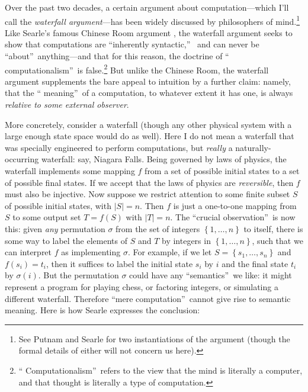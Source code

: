 \documentclass[12pt,onecolumn]{article}%
\begin{document}
Over the past two decades, a certain argument about computation---which I'll
call the \textit{waterfall argument}---has been widely discussed by
philosophers of mind.\footnote{See Putnam \cite[appendix]{putnam} and Searle
\cite{searle:redis} for two instantiations of the argument (though the formal
details of either will not concern us here).} Like Searle's famous Chinese
Room argument \cite{searle}, the waterfall argument seeks to show that
computations are \textquotedblleft inherently syntactic,\textquotedblright\ %
 and can never be \textquotedblleft about\textquotedblright\  anything---and
that for this reason, the doctrine of \textquotedblleft
computationalism\textquotedblright\  is false.\footnote{\textquotedblleft
Computationalism\textquotedblright\  refers to the view that the mind is
literally a computer, and that thought is literally a type of computation.}
 But unlike the Chinese Room, the waterfall argument supplements the bare
appeal to intuition by a further claim: namely, that the \textquotedblleft
meaning\textquotedblright\  of a computation, to whatever extent it has one, is
always \textit{relative to some external observer}.

More concretely, consider a waterfall (though any other physical system with a
large enough state space would do as well). Here I do not mean a waterfall
that was specially engineered to perform computations, but \textit{really} a
naturally-occurring waterfall: say, Niagara Falls. Being governed by laws of
physics, the waterfall implements some mapping $f$ from a set of possible
initial states to a set of possible final states. If we accept that the laws
of physics are \textit{reversible}, then $f$ must also be injective. Now
suppose we restrict attention to some finite subset $S$ of possible initial
states, with $\left\vert S\right\vert =n$. Then $f$ is just a one-to-one
mapping from $S$ to some output set $T=f(S)  $ with $\left\vert
T\right\vert =n$. The \textquotedblleft crucial
observation\textquotedblright\  is now this: given \textit{any} permutation
$\sigma$ from the set of integers $\left\{  1,\ldots,n\right\}  $ to itself,
there is some way to label the elements of $S$ and $T$ by integers in
$\left\{  1,\ldots,n\right\}  $, such that we can interpret $f$ as
implementing $\sigma$. For example, if we let $S=\left\{  s_{1}%
,\ldots,s_{n}\right\}  $ and $f(s_{i})  =t_{i}$, then it
suffices to label the initial state $s_{i}$ by $i$ and the final state
$t_{i}$ by $\sigma(i)  $. But the permutation $\sigma$ could
have any \textquotedblleft semantics\textquotedblright\  we like: it might
represent a program for playing chess, or factoring integers, or simulating a
different waterfall. Therefore \textquotedblleft mere
computation\textquotedblright\  cannot give rise to semantic meaning. Here is
how Searle \cite[p. 57]{searle:redis} expresses the conclusion:
\end{document}
